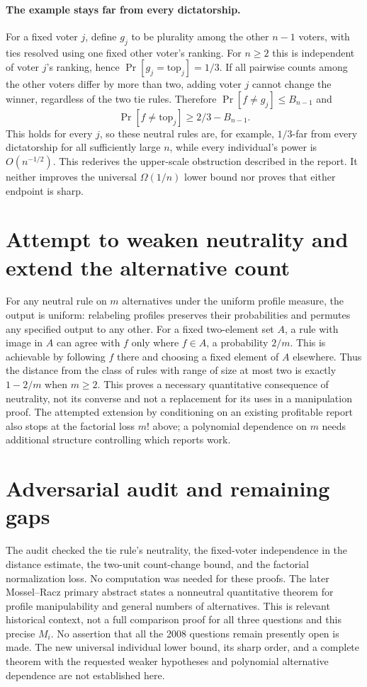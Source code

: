 \documentclass[11pt]{article}
\begin{document}
\paragraph{The example stays far from every dictatorship.}
For a fixed voter $j$, define $g_j$ to be plurality among the other $n-1$
voters, with ties resolved using one fixed other voter's ranking. For $n\ge2$
this is independent of voter $j$'s ranking, hence
$\Pr[g_j=\text{top}_j]=1/3$. If all pairwise counts among the other voters
differ by more than two, adding voter $j$ cannot change the winner, regardless
of the two tie rules. Therefore
$\Pr[f\ne g_j]\le B_{n-1}$ and
\[
\Pr[f\ne\text{top}_j]\ge 2/3-B_{n-1}.
\]
This holds for every $j$, so these neutral rules are, for example,
$1/3$-far from every dictatorship for all sufficiently large $n$, while
every individual's power is $O(n^{-1/2})$. This rederives the upper-scale
obstruction described in the report. It neither improves the universal
$\Omega(1/n)$ lower bound nor proves that either endpoint is sharp.

\section{Attempt to weaken neutrality and extend the alternative count}
For any neutral rule on $m$ alternatives under the uniform profile measure,
the output is uniform: relabeling profiles preserves their probabilities
and permutes any specified output to any other. For a fixed two-element
set $A$, a rule with image in $A$ can agree with $f$ only where $f\in A$,
a probability $2/m$. This is achievable by following $f$ there and choosing
a fixed element of $A$ elsewhere. Thus the distance from the class of rules
with range of size at most two is exactly $1-2/m$ when $m\ge2$.
This proves a necessary quantitative consequence of neutrality, not its
converse and not a replacement for its uses in a manipulation proof.
The attempted extension by conditioning on an existing profitable report
also stops at the factorial loss $m!$ above; a polynomial dependence on
$m$ needs additional structure controlling which reports work.

\section{Adversarial audit and remaining gaps}
The audit checked the tie rule's neutrality, the fixed-voter independence
in the distance estimate, the two-unit count-change bound, and the factorial
normalization loss. No computation was needed for these proofs.
The later Mossel--Racz primary abstract states a nonneutral quantitative theorem
for profile manipulability and general numbers of alternatives. This is relevant
historical context, not a full comparison proof for all three questions and
this precise $M_i$. No assertion that all the 2008 questions remain presently
open is made. The new universal individual lower bound, its sharp order,
and a complete theorem with the requested weaker hypotheses and polynomial
alternative dependence are not established here.
\end{document}
